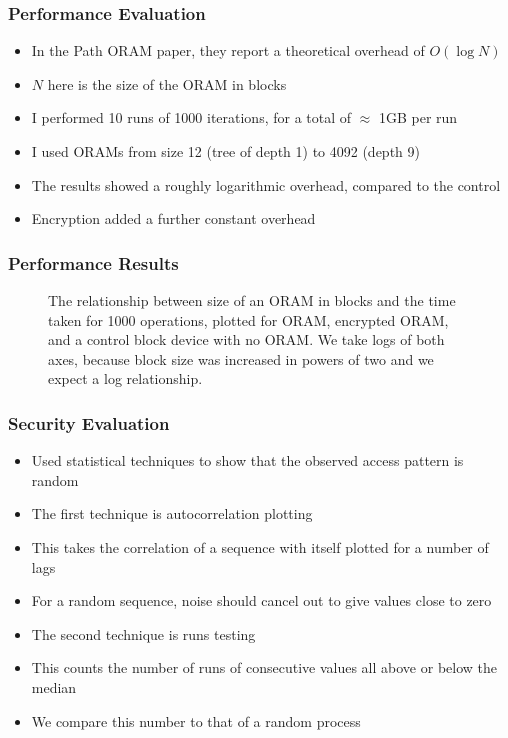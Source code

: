 \documentclass{beamer}
\begin{document}
\begin{frame}
    \frametitle{Performance Evaluation}
    \begin{itemize}
        \item In the Path ORAM paper, they report a theoretical overhead of $O(\log N)$
        \item $N$ here is the size of the ORAM in blocks
        \item I performed 10 runs of 1000 iterations, for a total of $\approx$ 1GB per run
        \item I used ORAMs from size 12 (tree of depth 1) to 4092 (depth 9)
        \item The results showed a roughly logarithmic overhead, compared to the control
        \item Encryption added a further constant overhead
    \end{itemize}
\end{frame}

\begin{frame}
    \frametitle{Performance Results}
    \begin{figure}
    \centering
    \scalebox{0.5}{}
    \caption{The relationship between size of an ORAM in blocks and the time taken for 1000 operations, plotted for ORAM, encrypted ORAM, and a control block device with no ORAM. We take logs of both axes, because block size was increased in powers of two and we expect a log relationship.}
    \label{fig:timeResults}
    \end{figure}
\end{frame}

\begin{frame}
    \frametitle{Security Evaluation}
    \begin{itemize}
        \item Used statistical techniques to show that the observed access pattern is random
        \item The first technique is autocorrelation plotting
        \item This takes the correlation of a sequence with itself plotted for a number of lags
        \item For a random sequence, noise should cancel out to give values close to zero
        \item The second technique is runs testing
        \item This counts the number of runs of consecutive values all above or below the median
        \item We compare this number to that of a random process
    \end{itemize}
\end{frame}
\end{document}
